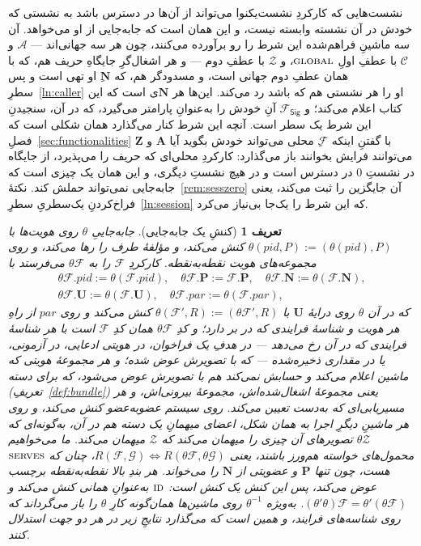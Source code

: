 \documentclass[10pt,oneside,openany]{book}
\newcommand{\Ps}{\mathbf{P}}
\newcommand{\PID}{\mathit{pid}}
\newcommand{\admits}{\mathbf{N}}
\newcommand{\Apid}{\mathbf{A}}
\newcommand{\Zpid}{\mathbf{Z}}
\newcommand{\pars}{\mathit{par}}
\newcommand{\uses}{\mathbf{U}}
\newcommand{\serves}{\op{serves}}
\newcommand{\Corr}{\mathcal{C}}
\newcommand{\F}{\mathcal{F}}
\newcommand{\G}{\mathcal{G}}
\newcommand{\Zenv}{\mathcal{Z}}
\newcommand{\Adv}{\mathcal{A}}
\newcommand{\op}[1]{\textnormal{\textsc{#1}}}
\newcommand{\Fsig}{\mathcal{F}_{\mathsf{Sig}}}
\theoremstyle{accentdef}
\newtheorem{definition}{تعریف}[chapter]
\theoremstyle{accentplain}
\begin{document}
نشست‌هایی که کارکردِ نشست‌یکنوا می‌تواند از آن‌ها در دسترس باشد به نشستی که
خودش در آن نشسته وابسته نیست، و این همان است که جابه‌جایی از او می‌خواهد.
آن سه ماشینِ فراهم‌شده این شرط را رو برآورده می‌کنند، چون هر سه جهانی‌اند
--- $\Adv$ و $\Corr$ با عطفِ اولِ $\op{global}$، و $\Zenv$ با عطفِ دوم ---
و هر اشغال‌گرِ جایگاهِ حریف هم، که با همان عطفِ دوم جهانی است، و مسدودگر
هم، که $\admits$ِ او تهی است و پس سطرِ~\ref{ln:caller} او را هر نشستی هم
که باشد رد می‌کند. این‌ها هر $\admits$ی است که این کتاب اعلام می‌کند؛ و
$\Fsig$ آنِ خودش را به‌عنوانِ پارامتر می‌گیرد، که در آن، سنجیدنِ این شرط یک
سطر است. آنچه این شرط کنار می‌گذارد همان شکلی است که
فصلِ~\ref{sec:functionalities} با گفتنِ اینکه $\F$ِ محلی می‌تواند خودش
بگوید آیا $\Apid$ و $\Zpid$ می‌توانند فرایش بخوانند باز می‌گذارد: کارکردِ
محلی‌ای که حریف را می‌پذیرد، از جایگاه در نشستِ $0$ در دسترس است و در هیچ
نشستِ دیگری، و این همان یک چیزی است که جابه‌جایی نمی‌تواند حملش کند.
نکتهٔ~\ref{rem:sesszero} آن جایگزین را ثبت می‌کند، یعنی فراخ‌کردنِ
یک‌سطریِ سطرِ~\ref{ln:session} که این شرط را یک‌جا بی‌نیاز می‌کرد.

\begin{definition}[کنشِ یک جابه‌جایی]\label{def:relocact}
جابه‌جاییِ $\theta$ روی هویت‌ها با $\theta(\PID,P) := (\theta(\PID),P)$ کنش
می‌کند، و مؤلفهٔ طرف را رها می‌کند، و روی مجموعه‌های هویت نقطه‌به‌نقطه.
کارکردِ $\F$ را به $\theta\F$ می‌فرستد با
\[
  \begin{gathered}
  \theta\F.\PID := \theta(\F.\PID), \quad
  \theta\F.\Ps := \F.\Ps, \quad
  \theta\F.\admits := \theta(\F.\admits), \\[2pt]
  \theta\F.\uses := \theta(\F.\uses), \quad
  \theta\F.\pars := \theta(\F.\pars) ,
  \end{gathered}
\]
که در آن $\theta$ روی درایهٔ $\uses$ با $\theta(\F',R) := (\theta\F',R)$ کنش
می‌کند و روی $\pars$ از راهِ هر هویت و شناسهٔ فرایندی که در بر دارد؛ و کدِ
$\theta\F$ همان کدِ $\F$ است با هر شناسهٔ فرایندی که در آن رخ می‌دهد --- در
هدفِ یک فراخوان، در هویتی ادعایی، در آزمونی، یا در مقداری ذخیره‌شده --- که
با تصویرش عوض شده؛ و هر مجموعهٔ هویتی که ماشین \emph{اعلام} می‌کند و
حسابش نمی‌کند هم با تصویرش عوض می‌شود، که برای دسته
(تعریفِ~\ref{def:bundle}) یعنی مجموعهٔ اشغال‌شده‌اش، مجموعهٔ بیرونی‌اش، و هر
مسیریابی‌ای که به‌دست تعیین می‌کند. روی سیستم عضوبه‌عضو کنش می‌کند، و روی
هر ماشینِ دیگرِ اجرا به همان شکل، اعضای میهمانِ یک دسته هم در آن، به‌گونه‌ای
که $\theta\Zenv$ تصویرهای آن چیزی را میهمان می‌کند که $\Zenv$ میهمان
می‌کند. ما می‌خواهیم محمول‌های خواسته هم‌ورز باشند، یعنی $R(\F,\G) \iff
R(\theta\F,\theta\G)$، چنان که $\serves$ هست، چون تنها $\Ps$ و عضویتی از
$\admits$ را می‌خواند. هر بندِ بالا نقطه‌به‌نقطه برچسب عوض می‌کند، پس این
کنش یک کنش است: $\op{id}$ به‌عنوانِ همانی کنش می‌کند و
$(\theta'\theta)\F = \theta'(\theta\F)$. به‌ویژه $\theta^{-1}$ روی ماشین‌ها
همان‌گونه کارِ $\theta$ را باز می‌گرداند که روی شناسه‌های فرایند، و همین است
که می‌گذارد نتایجِ زیر در هر دو جهت استدلال کنند.
\end{definition}
\end{document}
